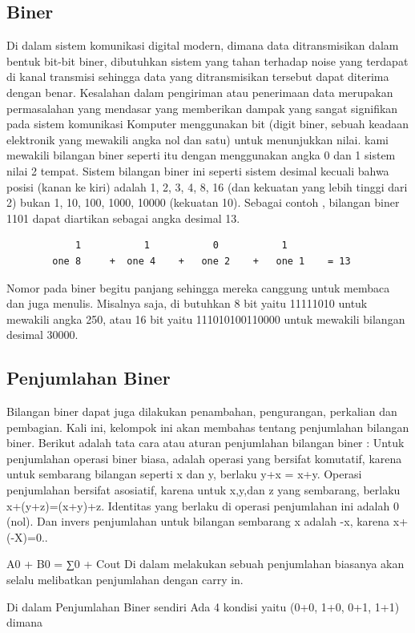 \subsection {Biner}
	Di dalam sistem komunikasi digital modern, dimana data ditransmisikan dalam bentuk bit-bit biner, dibutuhkan sistem yang tahan terhadap noise yang terdapat di kanal transmisi sehingga data yang ditransmisikan tersebut dapat diterima dengan benar. Kesalahan dalam pengiriman atau penerimaan data merupakan permasalahan yang mendasar yang memberikan dampak yang sangat signifikan pada sistem komunikasi
	Komputer menggunakan bit (digit biner, sebuah keadaan elektronik yang mewakili angka nol dan satu) untuk menunjukkan nilai. kami mewakili bilangan biner seperti itu dengan menggunakan angka 0 dan 1 sistem nilai 2 tempat. Sistem bilangan biner ini seperti sistem desimal kecuali bahwa posisi (kanan ke kiri) adalah 1, 2, 3, 4, 8, 16 (dan kekuatan yang lebih tinggi dari 2) bukan 1, 10, 100, 1000, 10000 (kekuatan 10). Sebagai contoh , bilangan biner 1101 dapat diartikan sebagai angka desimal 13.
		\begin{verbatim}
			1			1			0			1
		one 8	  +	 one 4	  +	  one 2    +   one 1 	= 13
		\end{verbatim}
	Nomor pada  biner begitu panjang sehingga mereka canggung  untuk membaca dan juga menulis. Misalnya saja, di butuhkan 8 bit yaitu  11111010 untuk mewakili angka 250, atau 16 bit yaitu 111010100110000 untuk mewakili bilangan desimal 30000.


	\subsection {Penjumlahan Biner}
	Bilangan biner dapat juga dilakukan penambahan, pengurangan, perkalian dan pembagian. Kali ini, kelompok ini akan membahas tentang penjumlahan bilangan biner. Berikut adalah tata cara atau aturan penjumlahan bilangan biner :
	Untuk penjumlahan operasi biner biasa, adalah operasi yang bersifat komutatif, karena untuk sembarang bilangan seperti x dan y, berlaku y+x = x+y. Operasi penjumlahan bersifat asosiatif, karena untuk x,y,dan z yang sembarang, berlaku x+(y+z)=(x+y)+z. Identitas yang berlaku di operasi penjumlahan ini adalah 0 (nol). Dan invers penjumlahan untuk bilangan sembarang x adalah -x, karena x+(-X)=0..

	A0 + B0 = ∑0 + Cout
	Di dalam melakukan sebuah penjumlahan biasanya akan selalu melibatkan penjumlahan dengan carry in.

	Di dalam Penjumlahan Biner sendiri Ada 4 kondisi yaitu
	(0+0, 1+0, 0+1, 1+1) dimana

